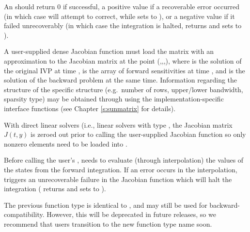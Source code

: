 {
  An  should return 0 if successful, a positive value if a recoverable
  error occurred (in which case {\idas} will attempt to correct, while {\idals} sets
   to ), or a negative
  value if it failed unrecoverably (in which case the integration is halted, 
  returns  and {\idals} sets  to
  ).
}
{
  A user-supplied dense Jacobian function must load the
  matrix  with an approximation to the Jacobian matrix
  at the point (,,,), where  is the solution
  of the original IVP at time ,  is the array of forward sensitivities
  at time , and  is the solution of the backward problem at the same time.
  Information regarding the structure of the specific {\sunmatrix}
  structure (e.g.~number of rows, upper/lower bandwidth, sparsity
  type) may be obtained through using the implementation-specific
  {\sunmatrix} interface functions (see Chapter \ref{s:sunmatrix} for
  details).

  With direct linear solvers (i.e., linear solvers with type
  , the Jacobian matrix $J(t,y)$ is zeroed out prior
  to calling the user-supplied Jacobian function so only nonzero elements need
  to be loaded into .

  {\warn}Before calling the user's , {\idas} needs to evaluate
  (through interpolation) the values of the states from the forward integration.
  If an error occurs in the interpolation, {\idas} triggers an unrecoverable
  failure in the Jacobian function which will halt the integration
  ( returns  and {\idals} sets  to
  ).


  The previous function type  is identical to
  , and may still be used for backward-compatibility.
  However, this will be deprecated in future releases, so we recommend
  that users transition to the new function type name soon.
}

